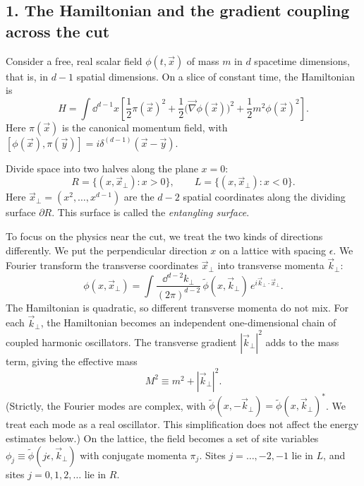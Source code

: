 \subsection*{1. The Hamiltonian and the gradient coupling across the cut}

Consider a free, real scalar field $\phi(t, \vec x)$ of mass $m$ in $d$ spacetime dimensions, that is, in
$d-1$ spatial dimensions. On a slice of constant time, the Hamiltonian is
\begin{equation}
H = \int \dd^{d-1}x \left[ \frac{1}{2}\pi(\vec x)^2 + \frac{1}{2}\big(\vec\nabla\phi(\vec x)\big)^2
+ \frac{1}{2}m^2\phi(\vec x)^2 \right].
\label{eq:scalar_hamiltonian_continuum}
\end{equation}
Here $\pi(\vec x)$ is the canonical momentum field, with $[\phi(\vec x), \pi(\vec y)] = i\delta^{(d-1)}(\vec x - \vec y)$.

Divide space into two halves along the plane $x = 0$:
\[
R = \{ (x, \vec x_\perp) : x > 0 \}, \qquad L = \{ (x, \vec x_\perp) : x < 0 \}.
\]
Here $\vec x_\perp = (x^2, \dots, x^{d-1})$ are the $d-2$ spatial coordinates along the dividing surface
$\partial R$. This surface is called the \emph{entangling surface}.

To focus on the physics near the cut, we treat the two kinds of directions differently. We put the
perpendicular direction $x$ on a lattice with spacing $\epsilon$. We Fourier transform the transverse
coordinates $\vec x_\perp$ into transverse momenta $\vec k_\perp$:
\[
\phi(x, \vec x_\perp) = \int \frac{\dd^{d-2}k_\perp}{(2\pi)^{d-2}} \, \widetilde\phi(x, \vec k_\perp) \, e^{i \vec k_\perp \cdot \vec x_\perp} .
\]
The Hamiltonian is quadratic, so different transverse momenta do not mix. For each $\vec k_\perp$, the
Hamiltonian becomes an independent one-dimensional chain of coupled harmonic oscillators. The transverse
gradient $|\vec k_\perp|^2$ adds to the mass term, giving the effective mass
\begin{equation}
M^2 \equiv m^2 + |\vec k_\perp|^2 .
\label{eq:effective_mass_transverse}
\end{equation}
(Strictly, the Fourier modes are complex, with $\widetilde\phi(x,-\vec k_\perp)=\widetilde\phi(x,\vec k_\perp)^*$.
We treat each mode as a real oscillator. This simplification does not affect the energy estimates below.)
On the lattice, the field becomes a set of site variables $\phi_j \equiv \widetilde\phi(j\epsilon, \vec
k_\perp)$ with conjugate momenta $\pi_j$. Sites $j = \dots, -2, -1$ lie in $L$, and sites $j = 0, 1, 2, \dots$
lie in $R$.

